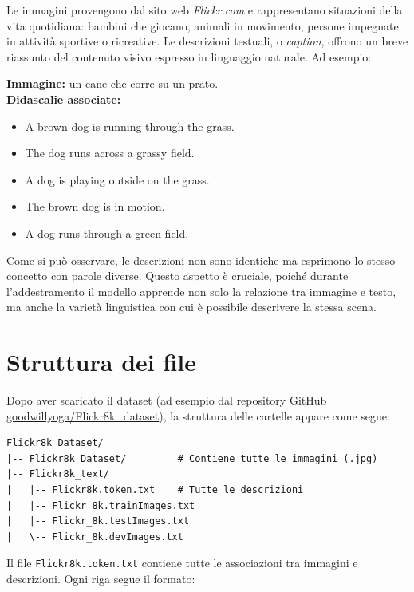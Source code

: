 \documentclass[11pt,a4paper]{report}
\begin{document}
Le immagini provengono dal sito web \emph{Flickr.com} e rappresentano situazioni della vita quotidiana: bambini che giocano, animali in movimento, persone impegnate in attività sportive o ricreative.  
Le descrizioni testuali, o \emph{caption}, offrono un breve riassunto del contenuto visivo espresso in linguaggio naturale. Ad esempio:

\begin{tcolorbox}[title=Esempio di didascalia]
\textbf{Immagine:} un cane che corre su un prato.\\[0.3em]
\textbf{Didascalie associate:}
\begin{itemize}
  \item A brown dog is running through the grass.
  \item The dog runs across a grassy field.
  \item A dog is playing outside on the grass.
  \item The brown dog is in motion.
  \item A dog runs through a green field.
\end{itemize}
\end{tcolorbox}

Come si può osservare, le descrizioni non sono identiche ma esprimono lo stesso concetto con parole diverse.  
Questo aspetto è cruciale, poiché durante l’addestramento il modello apprende non solo la relazione tra immagine e testo, ma anche la varietà linguistica con cui è possibile descrivere la stessa scena.

\section{Struttura dei file}

Dopo aver scaricato il dataset (ad esempio dal repository GitHub \href{https://github.com/goodwillyoga/Flickr8k_dataset}{goodwillyoga/Flickr8k\_dataset}), la struttura delle cartelle appare come segue:

\begin{verbatim}
Flickr8k_Dataset/
|-- Flickr8k_Dataset/         # Contiene tutte le immagini (.jpg)
|-- Flickr8k_text/
|   |-- Flickr8k.token.txt    # Tutte le descrizioni
|   |-- Flickr_8k.trainImages.txt
|   |-- Flickr_8k.testImages.txt
|   \-- Flickr_8k.devImages.txt
\end{verbatim}

Il file \texttt{Flickr8k.token.txt} contiene tutte le associazioni tra immagini e descrizioni.  
Ogni riga segue il formato:
\end{document}
